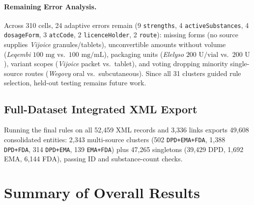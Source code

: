 \documentclass{llncs}
\begin{document}
\paragraph{Remaining Error Analysis.}
Across 310 cells, 24 adaptive errors remain (9 \texttt{strengths}, 4 \texttt{activeSubstances}, 4 \texttt{dosageForm}, 3 \texttt{atcCode}, 2 \texttt{licenceHolder}, 2 \texttt{route}): missing forms (no source supplies \textit{Vijoice} granules/tablets), unconvertible amounts without volume (\textit{Leqembi} $100\text{ mg}$ vs.\ $100\text{ mg/mL}$), packaging units (\textit{Elelyso} $200\text{ U/vial}$ vs.\ $200\text{ U}$), variant scopes (\textit{Vijoice} packet vs.\ tablet), and voting dropping minority single-source routes (\textit{Wegovy} oral vs.\ subcutaneous). Since all 31 clusters guided rule selection, held-out testing remains future work.

\subsection{Full-Dataset Integrated XML Export}
Running the final rules on all 52,459 XML records and 3,336 links exports 49,608 consolidated entities: 2,343 multi-source clusters (502 \texttt{DPD+EMA+FDA}, 1,388 \texttt{DPD+FDA}, 314 \texttt{DPD+EMA}, 139 \texttt{EMA+FDA}) plus 47,265 singletons (39,429 DPD, 1,692 EMA, 6,144 FDA), passing ID and substance-count checks.

\section{Summary of Overall Results}
\label{sec:conclusion}
\end{document}
